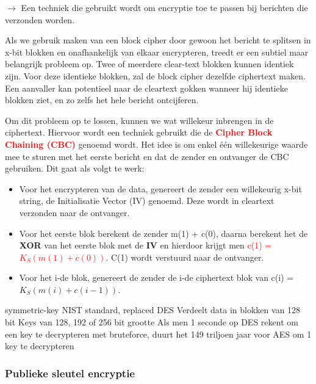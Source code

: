 
$\rightarrow$ Een techniek die gebruikt wordt om encryptie toe te passen bij berichten die verzonden worden.

\noindent Als we gebruik maken van een block cipher door gewoon het bericht te splitsen in x-bit blokken en onafhankelijk van elkaar encrypteren, treedt er een subtiel maar belangrijk probleem op. Twee of meerdere clear-text blokken kunnen identiek zijn. Voor deze identieke blokken, zal de block cipher dezelfde ciphertext maken. Een aanvaller kan potentieel naar de cleartext gokken wanneer hij identieke blokken ziet, en zo zelfs het hele bericht ontcijferen.

Om dit probleem op te lossen, kunnen we wat willekeur inbrengen in de ciphertext. Hiervoor wordt een techniek gebruikt die de \textcolor{red}{\textbf{Cipher Block Chaining (CBC)}} genoemd wordt. Het idee is om enkel één willekeurige waarde mee te sturen met het eerste bericht en dat de zender en ontvanger de CBC gebruiken. Dit gaat als volgt te werk:

\begin{itemize}

\item Voor het encrypteren van de data, genereert de zender een willekeurig x-bit string, de Initialisatie Vector (IV) genoemd. Deze wordt in cleartext verzonden naar de ontvanger.

\item Voor het eerste blok berekent de zender m(1) + c(0), daarna berekent het de \textbf{XOR} van het eerste blok met de \textbf{IV} en hierdoor krijgt men \textcolor{red}{c(1) = $K_S(m(1) + c(0))$}. C(1) wordt verstuurd naar de ontvanger.

\item Voor het i-de blok, genereert de zender de i-de ciphertext blok van c(i) = $K_S(m(i) + c(i-1))$.

\end{itemize}

\bi
\itf symmetric-key NIST standard, replaced DES
\itf Verdeelt data in blokken van 128 bit
\itf Keys van 128, 192 of 256 bit grootte
\itf Als men 1 seconde op DES rekent om een key te decrypteren met bruteforce, duurt het 149 triljoen jaar voor AES om 1 key te decrypteren
\ei


\subsubsection{Publieke sleutel encryptie}

